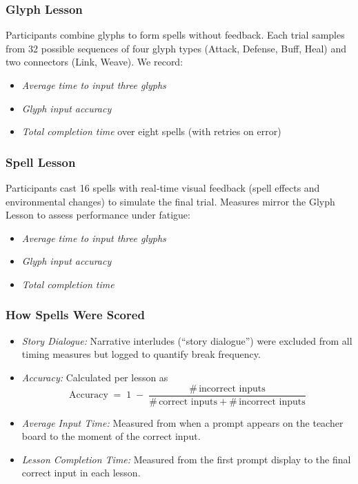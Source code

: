 \documentclass[acmlarge]{acmart}
\begin{document}
\subsubsection{Glyph Lesson}
Participants combine glyphs to form spells without feedback. Each trial samples from 32 possible sequences of four glyph types (Attack, Defense, Buff, Heal) and two connectors (Link, Weave). We record:
\begin{itemize}
  \item \emph{Average time to input three glyphs}
  \item \emph{Glyph input accuracy}
  \item \emph{Total completion time} over eight spells (with retries on error)
\end{itemize}

\subsubsection{Spell Lesson}
Participants cast 16 spells with real‐time visual feedback (spell effects and environmental changes) to simulate the final trial. Measures mirror the Glyph Lesson to assess performance under fatigue:
\begin{itemize}
  \item \emph{Average time to input three glyphs}
  \item \emph{Glyph input accuracy}
  \item \emph{Total completion time}
\end{itemize}
\subsubsection{How Spells Were Scored}
\begin{itemize}
      \item \emph{Story Dialogue:}  
        Narrative interludes (“story dialogue”) were excluded from all timing measures but logged to quantify break frequency.  
      \item \emph{Accuracy:}  
        Calculated per lesson as  
        \[
          \mathrm{Accuracy} \;=\; 1 \;-\; \frac{\#\,\text{incorrect inputs}}{\#\,\text{correct inputs} + \#\,\text{incorrect inputs}}
        \]
      \item \emph{Average Input Time:}  
        Measured from when a prompt appears on the teacher board to the moment of the correct input.  
      \item \emph{Lesson Completion Time:}  
        Measured from the first prompt display to the final correct input in each lesson.  
   

\end{itemize}
\end{document}
